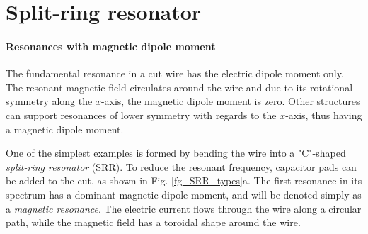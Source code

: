 %     

\FloatBarrier %
\section{Split-ring resonator} \label{section_srr} %
\paragraph{Resonances with magnetic dipole moment}%
The fundamental resonance in a cut wire has the electric dipole moment only. The resonant magnetic field circulates around the wire and due to its rotational symmetry along the $x$-axis, the magnetic dipole moment is zero. Other structures can support resonances of lower symmetry with regards to the $x$-axis, thus having a magnetic dipole moment.

One of the simplest examples is formed by bending the wire into a "C"-shaped \textit{split-ring resonator} (SRR). To reduce the resonant frequency, capacitor pads can be added to the cut, as shown in Fig. \ref{fg_SRR_types}a. The first resonance in its spectrum has a dominant magnetic dipole moment, and will be denoted simply as a \textit{magnetic resonance}. The electric current flows through the wire along a circular path, while the magnetic field has a toroidal shape around the wire.   

